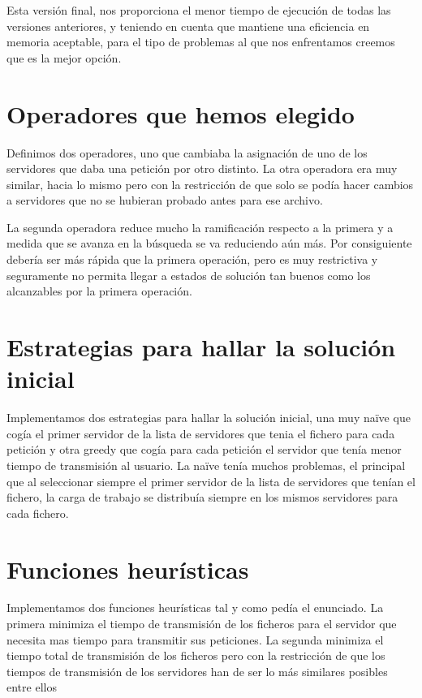 Esta versión final, nos proporciona el menor tiempo de ejecución de todas las versiones anteriores, y teniendo en cuenta que mantiene una eficiencia en memoria aceptable, para el tipo de problemas al que nos enfrentamos creemos que es la mejor opción. 



\section{Operadores que hemos elegido}%
\label{sec:operadores_elegidos}

Definimos dos operadores, uno que cambiaba la asignación de uno de los servidores que daba una petición por otro distinto.
La otra operadora era muy similar, hacia lo mismo pero con la restricción de que solo se podía hacer cambios a servidores
que no se hubieran probado antes para ese archivo.

La segunda operadora reduce mucho la ramificación respecto a la primera y a medida que se avanza en la búsqueda se va
reduciendo aún más. Por consiguiente debería ser más rápida que la primera operación, pero es muy restrictiva y seguramente
no permita llegar a estados de solución tan buenos como los alcanzables por la primera operación.

\section{Estrategias para hallar la solución inicial}%
\label{sec:estrat_sol}

Implementamos dos estrategias para hallar la solución inicial, una muy naïve que cogía el primer servidor
de la lista de servidores que tenia el fichero para cada petición y otra greedy que cogía para cada petición
el servidor que tenía menor tiempo de transmisión al usuario. La naïve tenía muchos problemas, el principal
que al seleccionar siempre el primer servidor de la lista de servidores que tenían el fichero, la carga de
trabajo se distribuía siempre en los mismos servidores para cada fichero.

\section{Funciones heurísticas}

Implementamos dos funciones heurísticas tal y como pedía el enunciado. La primera minimiza el tiempo de transmisión
de los ficheros para el servidor que necesita mas tiempo para transmitir sus peticiones. La segunda minimiza
el tiempo total de transmisión de los ficheros pero con la restricción de que los tiempos de transmisión de los servidores
han de ser lo más similares posibles entre ellos

